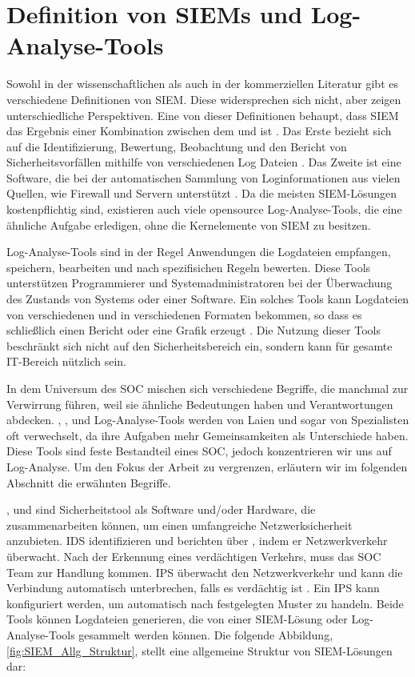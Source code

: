 \section{Definition von SIEMs und Log-Analyse-Tools}

Sowohl in der wissenschaftlichen als auch in der kommerziellen Literatur gibt es verschiedene Definitionen von \gls{SIEM}. Diese widersprechen sich nicht, aber zeigen unterschiedliche Perspektiven. Eine von dieser Definitionen behaupt, dass \gls{SIEM} das Ergebnis einer Kombination zwischen dem  und  ist \citep{Dorigo_SIEM}. Das Erste bezieht sich auf die Identifizierung, Bewertung, Beobachtung und den Bericht von Sicherheitsvorfällen mithilfe von verschiedenen Log Dateien \citep{techopedia_SEM}. Das Zweite ist eine Software, die bei der automatischen Sammlung von Loginformationen aus vielen Quellen, wie Firewall und Servern unterstützt \citep{techopedia_SIM}. Da die meisten \gls{SIEM}-Lösungen kostenpflichtig sind, existieren auch viele \gls{opensource} Log-Analyse-Tools, die eine ähnliche Aufgabe erledigen, ohne die Kernelemente von \gls{SIEM} zu besitzen. 

Log-Analyse-Tools sind in der Regel Anwendungen die Logdateien empfangen, speichern, bearbeiten und nach spezifisichen  Regeln bewerten. Diese Tools unterstützen Programmierer und Systemadministratoren bei der Überwachung des Zustands von Systems oder einer Software. Ein solches Tools kann Logdateien von verschiedenen  und in verschiedenen Formaten bekommen, so dass es schließlich einen Bericht oder eine Grafik erzeugt \citep{Korzeniowski_LATDef}. Die Nutzung dieser Tools beschränkt sich nicht auf den Sicherheitsbereich ein, sondern kann für gesamte IT-Bereich  nützlich sein.

In dem Universum des \gls{SOC} mischen sich verschiedene Begriffe, die manchmal zur Verwirrung führen, weil sie ähnliche Bedeutungen haben und Verantwortungen abdecken. , ,  und Log-Analyse-Tools werden von Laien und sogar von Spezialisten oft verwechselt, da ihre Aufgaben mehr Gemeinsamkeiten als Unterschiede haben. Diese Tools sind feste Bestandteil eines \gls{SOC}, jedoch konzentrieren wir uns auf Log-Analyse. Um den Fokus der Arbeit zu vergrenzen, erläutern wir im folgenden Abschnitt die erwähnten Begriffe.

\newpage
{},  und  sind Sicherheitstool als Software und/oder Hardware, die zusammenarbeiten können, um einen umfangreiche Netzwerksicherheit anzubieten. \gls{IDS} identifizieren und berichten über , indem er Netzwerkverkehr überwacht. Nach der Erkennung eines verdächtigen Verkehrs, muss das \gls{SOC} Team zur Handlung kommen. \gls{IPS} überwacht den Netzwerkverkehr und kann die Verbindung automatisch unterbrechen, falls es verdächtig ist \citep{Wendzel_IS}. Ein \gls{IPS} kann konfiguriert werden, um automatisch nach festgelegten Muster zu handeln. Beide Tools können Logdateien generieren, die von einer \gls{SIEM}-Lösung oder Log-Analyse-Tools gesammelt werden können. Die folgende Abbildung, \ref{fig:SIEM_Allg_Struktur}, stellt eine allgemeine Struktur von \gls{SIEM}-Lösungen dar:

